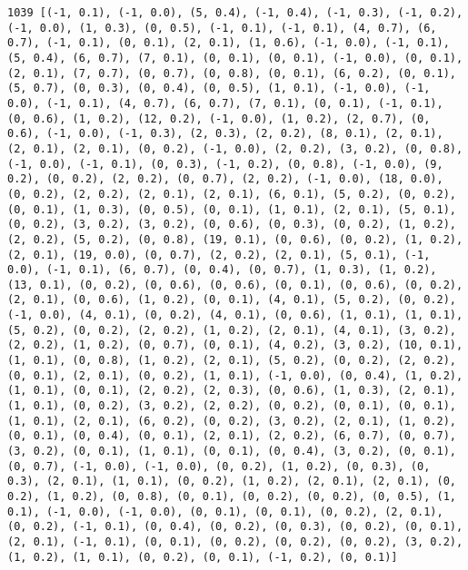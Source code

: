 \documentclass[11pt]{article}
\begin{document}
\begin{Verbatim}[commandchars=\\\{\}]
1039 [(-1, 0.1), (-1, 0.0), (5, 0.4), (-1, 0.4), (-1, 0.3), (-1, 0.2), (-1, 0.0), (1, 0.3), (0, 0.5), (-1, 0.1), (-1, 0.1), (4, 0.7), (6, 0.7), (-1, 0.1), (0, 0.1), (2, 0.1), (1, 0.6), (-1, 0.0), (-1, 0.1), (5, 0.4), (6, 0.7), (7, 0.1), (0, 0.1), (0, 0.1), (-1, 0.0), (0, 0.1), (2, 0.1), (7, 0.7), (0, 0.7), (0, 0.8), (0, 0.1), (6, 0.2), (0, 0.1), (5, 0.7), (0, 0.3), (0, 0.4), (0, 0.5), (1, 0.1), (-1, 0.0), (-1, 0.0), (-1, 0.1), (4, 0.7), (6, 0.7), (7, 0.1), (0, 0.1), (-1, 0.1), (0, 0.6), (1, 0.2), (12, 0.2), (-1, 0.0), (1, 0.2), (2, 0.7), (0, 0.6), (-1, 0.0), (-1, 0.3), (2, 0.3), (2, 0.2), (8, 0.1), (2, 0.1), (2, 0.1), (2, 0.1), (0, 0.2), (-1, 0.0), (2, 0.2), (3, 0.2), (0, 0.8), (-1, 0.0), (-1, 0.1), (0, 0.3), (-1, 0.2), (0, 0.8), (-1, 0.0), (9, 0.2), (0, 0.2), (2, 0.2), (0, 0.7), (2, 0.2), (-1, 0.0), (18, 0.0), (0, 0.2), (2, 0.2), (2, 0.1), (2, 0.1), (6, 0.1), (5, 0.2), (0, 0.2), (0, 0.1), (1, 0.3), (0, 0.5), (0, 0.1), (1, 0.1), (2, 0.1), (5, 0.1), (0, 0.2), (3, 0.2), (3, 0.2), (0, 0.6), (0, 0.3), (0, 0.2), (1, 0.2), (2, 0.2), (5, 0.2), (0, 0.8), (19, 0.1), (0, 0.6), (0, 0.2), (1, 0.2), (2, 0.1), (19, 0.0), (0, 0.7), (2, 0.2), (2, 0.1), (5, 0.1), (-1, 0.0), (-1, 0.1), (6, 0.7), (0, 0.4), (0, 0.7), (1, 0.3), (1, 0.2), (13, 0.1), (0, 0.2), (0, 0.6), (0, 0.6), (0, 0.1), (0, 0.6), (0, 0.2), (2, 0.1), (0, 0.6), (1, 0.2), (0, 0.1), (4, 0.1), (5, 0.2), (0, 0.2), (-1, 0.0), (4, 0.1), (0, 0.2), (4, 0.1), (0, 0.6), (1, 0.1), (1, 0.1), (5, 0.2), (0, 0.2), (2, 0.2), (1, 0.2), (2, 0.1), (4, 0.1), (3, 0.2), (2, 0.2), (1, 0.2), (0, 0.7), (0, 0.1), (4, 0.2), (3, 0.2), (10, 0.1), (1, 0.1), (0, 0.8), (1, 0.2), (2, 0.1), (5, 0.2), (0, 0.2), (2, 0.2), (0, 0.1), (2, 0.1), (0, 0.2), (1, 0.1), (-1, 0.0), (0, 0.4), (1, 0.2), (1, 0.1), (0, 0.1), (2, 0.2), (2, 0.3), (0, 0.6), (1, 0.3), (2, 0.1), (1, 0.1), (0, 0.2), (3, 0.2), (2, 0.2), (0, 0.2), (0, 0.1), (0, 0.1), (1, 0.1), (2, 0.1), (6, 0.2), (0, 0.2), (3, 0.2), (2, 0.1), (1, 0.2), (0, 0.1), (0, 0.4), (0, 0.1), (2, 0.1), (2, 0.2), (6, 0.7), (0, 0.7), (3, 0.2), (0, 0.1), (1, 0.1), (0, 0.1), (0, 0.4), (3, 0.2), (0, 0.1), (0, 0.7), (-1, 0.0), (-1, 0.0), (0, 0.2), (1, 0.2), (0, 0.3), (0, 0.3), (2, 0.1), (1, 0.1), (0, 0.2), (1, 0.2), (2, 0.1), (2, 0.1), (0, 0.2), (1, 0.2), (0, 0.8), (0, 0.1), (0, 0.2), (0, 0.2), (0, 0.5), (1, 0.1), (-1, 0.0), (-1, 0.0), (0, 0.1), (0, 0.1), (0, 0.2), (2, 0.1), (0, 0.2), (-1, 0.1), (0, 0.4), (0, 0.2), (0, 0.3), (0, 0.2), (0, 0.1), (2, 0.1), (-1, 0.1), (0, 0.1), (0, 0.2), (0, 0.2), (0, 0.2), (3, 0.2), (1, 0.2), (1, 0.1), (0, 0.2), (0, 0.1), (-1, 0.2), (0, 0.1)]

\end{Verbatim}
\end{document}
